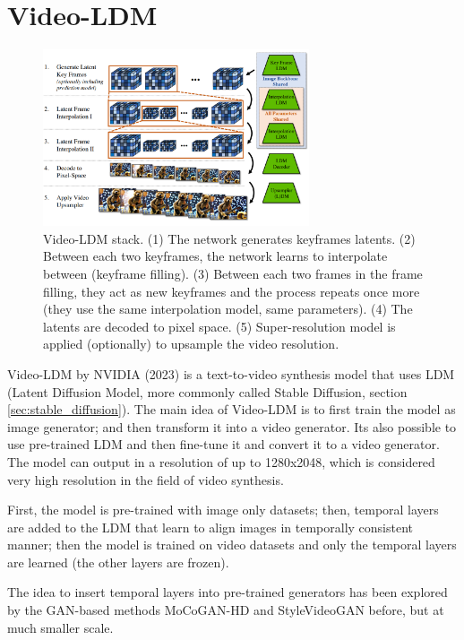 \section{Video-LDM}
\label{sec:videoldm}

\begin{figure}
    \centering
    \includegraphics[width=0.7\textwidth]{images/video_ldm/stack.png}
    \caption{Video-LDM stack. (1) The network generates keyframes latents. (2) Between each two keyframes, the network learns to interpolate between (keyframe filling). (3) Between each two frames in the frame filling, they act as new keyframes and the process repeats once more (they use the same interpolation model, same parameters). (4) The latents are decoded to pixel space. (5) Super-resolution model is applied (optionally) to upsample the video resolution.}
\end{figure}

Video-LDM by NVIDIA (2023) \cite{video_ldm} is a text-to-video synthesis model that uses LDM (Latent Diffusion Model, more commonly called Stable Diffusion, section \ref{sec:stable_diffusion}). The main idea of Video-LDM is to first train the model as image generator; and then transform it into a video generator. Its also possible to use pre-trained LDM and then fine-tune it and convert it to a video generator. The model can output in a resolution of up to 1280x2048, which is considered very high resolution in the field of video synthesis.

First, the model is pre-trained with image only datasets; then, temporal layers are added to the LDM that learn to align images in temporally consistent manner; then the model is trained on video datasets and only the temporal layers are learned (the other layers are frozen).

The idea to insert temporal layers into pre-trained generators has been explored by the GAN-based methods MoCoGAN-HD \cite{mocogan_hd} and StyleVideoGAN \cite{style_video_gan} before, but at much smaller scale.


